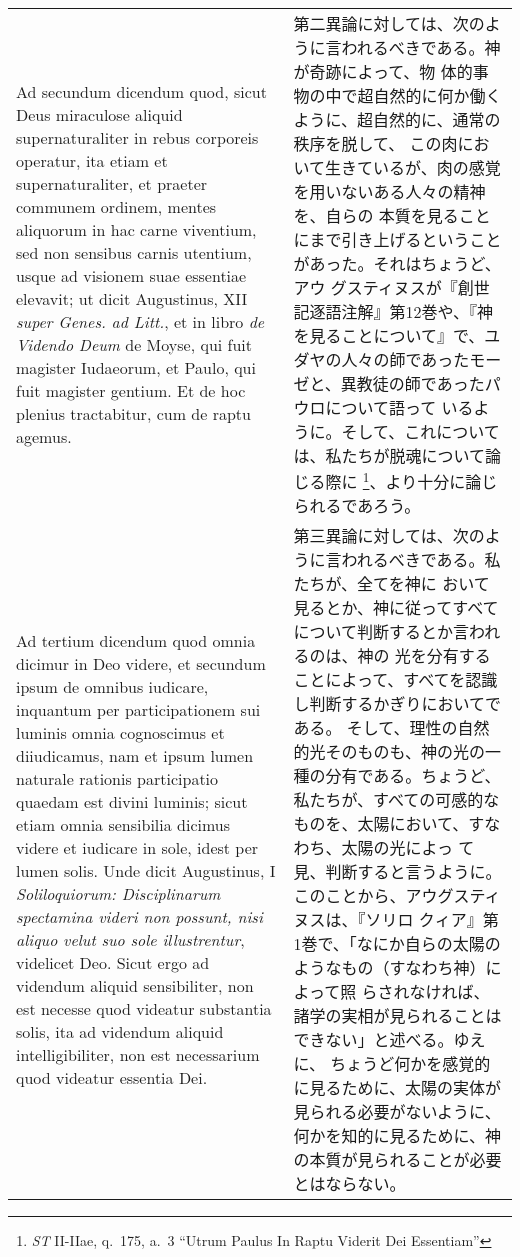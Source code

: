 \documentclass[10pt]{jsarticle} %
\begin{document}
\begin{longtable}{p{21em}p{21em}}
\\

{\sc Ad secundum dicendum} quod, sicut Deus miraculose aliquid
supernaturaliter in rebus corporeis operatur, ita etiam et
supernaturaliter, et praeter communem ordinem, mentes aliquorum in hac
carne viventium, sed non sensibus carnis utentium, usque ad visionem
suae essentiae elevavit; ut dicit Augustinus, XII {\it super Genes. ad
Litt.}, et in libro {\it de Videndo Deum} de Moyse, qui fuit magister
Iudaeorum, et Paulo, qui fuit magister gentium. Et de hoc plenius
tractabitur, cum de raptu agemus.

&

第二異論に対しては、次のように言われるべきである。神が奇跡によって、物
体的事物の中で超自然的に何か働くように、超自然的に、通常の秩序を脱して、
この肉において生きているが、肉の感覚を用いないある人々の精神を、自らの
本質を見ることにまで引き上げるということがあった。それはちょうど、アウ
グスティヌスが『創世記逐語注解』第12巻や、『神を見ることについて』で、ユ
ダヤの人々の師であったモーゼと、異教徒の師であったパウロについて語って
いるように。そして、これについては、私たちが脱魂について論じる際に
\footnote{{\it ST} II-IIae, q.~175, a.~3 ``Utrum Paulus In Raptu
Viderit Dei Essentiam''}、より十分に論じられるであろう。

\\

{\sc Ad tertium dicendum} quod omnia dicimur in Deo videre, et
secundum ipsum de omnibus iudicare, inquantum per participationem sui
luminis omnia cognoscimus et diiudicamus, nam et ipsum lumen naturale
rationis participatio quaedam est divini luminis; sicut etiam omnia
sensibilia dicimus videre et iudicare in sole, idest per lumen
solis. Unde dicit Augustinus, I {\it Soliloquiorum: Disciplinarum
spectamina videri non possunt, nisi aliquo velut suo sole
illustrentur}, videlicet Deo. Sicut ergo ad videndum aliquid
sensibiliter, non est necesse quod videatur substantia solis, ita ad
videndum aliquid intelligibiliter, non est necessarium quod videatur
essentia Dei.

&

第三異論に対しては、次のように言われるべきである。私たちが、全てを神に
おいて見るとか、神に従ってすべてについて判断するとか言われるのは、神の
光を分有することによって、すべてを認識し判断するかぎりにおいてである。
そして、理性の自然的光そのものも、神の光の一種の分有である。ちょうど、
私たちが、すべての可感的なものを、太陽において、すなわち、太陽の光によっ
て見、判断すると言うように。このことから、アウグスティヌスは、『ソリロ
クィア』第1巻で、「なにか自らの太陽のようなもの（すなわち神）によって照
らされなければ、諸学の実相が見られることはできない」と述べる。ゆえに、
ちょうど何かを感覚的に見るために、太陽の実体が見られる必要がないように、
何かを知的に見るために、神の本質が見られることが必要とはならない。


\end{longtable}
\end{document}
